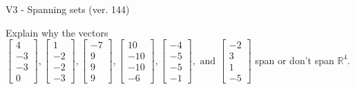 \begin{exercise}
  \begin{exerciseTitle}V3 - Spanning sets (ver. 144)\end{exerciseTitle}
  \begin{exerciseStatement}
    Explain why the vectors \(\left[\begin{array}{r}
4 \\
-3 \\
-3 \\
0
\end{array}\right] , \left[\begin{array}{r}
1 \\
-2 \\
-2 \\
-3
\end{array}\right] , \left[\begin{array}{r}
-7 \\
9 \\
9 \\
9
\end{array}\right] , \left[\begin{array}{r}
10 \\
-10 \\
-10 \\
-6
\end{array}\right] , \left[\begin{array}{r}
-4 \\
-5 \\
-5 \\
-1
\end{array}\right] , \text{ and } \left[\begin{array}{r}
-2 \\
3 \\
1 \\
-5
\end{array}\right]\) span or don't span \(\mathbb{R}^4\). 
	



\end{exerciseStatement}
\end{exercise}
